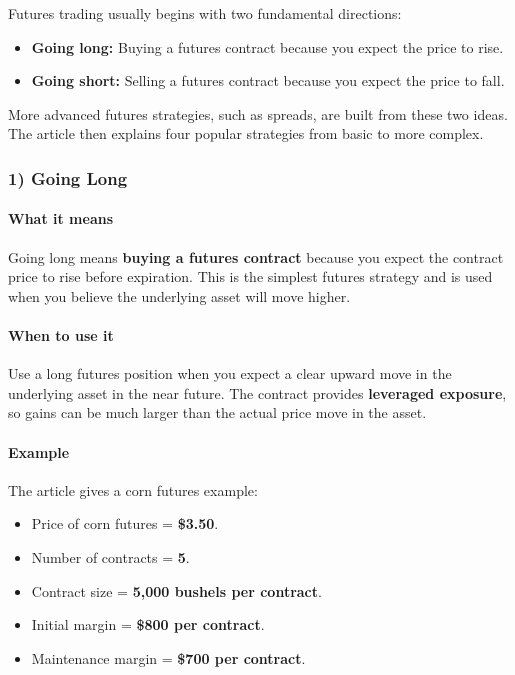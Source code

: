 \documentclass[12pt,openany]{book}
\begin{document}
Futures trading usually begins with two fundamental directions:

\begin{itemize}[leftmargin=*]
    \item \textbf{Going long:} Buying a futures contract because you expect the price to rise.
    \item \textbf{Going short:} Selling a futures contract because you expect the price to fall.
\end{itemize}

More advanced futures strategies, such as spreads, are built from these two ideas. The article then explains four popular strategies from basic to more complex.

\subsubsection{1) Going Long}

\paragraph{What it means}

Going long means \textbf{buying a futures contract} because you expect the contract price to rise before expiration. This is the simplest futures strategy and is used when you believe the underlying asset will move higher.

\paragraph{When to use it}

Use a long futures position when you expect a clear upward move in the underlying asset in the near future. The contract provides \textbf{leveraged exposure}, so gains can be much larger than the actual price move in the asset.

\paragraph{Example}

The article gives a corn futures example:

\begin{itemize}[leftmargin=*]
    \item Price of corn futures = \textbf{\$3.50}.
    \item Number of contracts = \textbf{5}.
    \item Contract size = \textbf{5,000 bushels per contract}.
    \item Initial margin = \textbf{\$800 per contract}.
    \item Maintenance margin = \textbf{\$700 per contract}.
\end{itemize}
\end{document}
